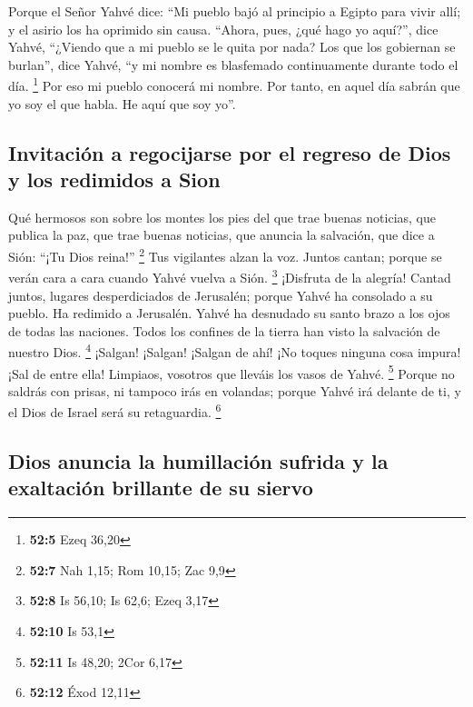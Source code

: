  Porque el Señor Yahvé dice: ``Mi pueblo bajó al principio
a Egipto para vivir allí; y el asirio los ha oprimido sin causa.
 ``Ahora, pues, ¿qué hago yo aquí?'', dice Yahvé,
``¿Viendo que a mi pueblo se le quita por nada? Los que los gobiernan se
burlan'', dice Yahvé, ``y mi nombre es blasfemado continuamente durante
todo el día. \footnote{\textbf{52:5} Ezeq 36,20}  Por eso
mi pueblo conocerá mi nombre. Por tanto, en aquel día sabrán que yo soy
el que habla. He aquí que soy yo''.

\hypertarget{invitaciuxf3n-a-regocijarse-por-el-regreso-de-dios-y-los-redimidos-a-sion}{%
\subsection{Invitación a regocijarse por el regreso de Dios y los
redimidos a
Sion}\label{invitaciuxf3n-a-regocijarse-por-el-regreso-de-dios-y-los-redimidos-a-sion}}

 Qué hermosos son sobre los montes los pies del que trae
buenas noticias, que publica la paz, que trae buenas noticias, que
anuncia la salvación, que dice a Sión: ``¡Tu Dios reina!'' \footnote{\textbf{52:7}
  Nah 1,15; Rom 10,15; Zac 9,9}  Tus vigilantes alzan la
voz. Juntos cantan; porque se verán cara a cara cuando Yahvé vuelva a
Sión. \footnote{\textbf{52:8} Is 56,10; Is 62,6; Ezeq 3,17}
 ¡Disfruta de la alegría! Cantad juntos, lugares
desperdiciados de Jerusalén; porque Yahvé ha consolado a su pueblo. Ha
redimido a Jerusalén.  Yahvé ha desnudado su santo brazo
a los ojos de todas las naciones. Todos los confines de la tierra han
visto la salvación de nuestro Dios. \footnote{\textbf{52:10} Is 53,1}
 ¡Salgan! ¡Salgan! ¡Salgan de ahí! ¡No toques ninguna
cosa impura! ¡Sal de entre ella! Limpiaos, vosotros que lleváis los
vasos de Yahvé. \footnote{\textbf{52:11} Is 48,20; 2Cor 6,17}
 Porque no saldrás con prisas, ni tampoco irás en
volandas; porque Yahvé irá delante de ti, y el Dios de Israel será su
retaguardia. \footnote{\textbf{52:12} Éxod 12,11}

\hypertarget{dios-anuncia-la-humillaciuxf3n-sufrida-y-la-exaltaciuxf3n-brillante-de-su-siervo}{%
\subsection{Dios anuncia la humillación sufrida y la exaltación
brillante de su
siervo}\label{dios-anuncia-la-humillaciuxf3n-sufrida-y-la-exaltaciuxf3n-brillante-de-su-siervo}}

